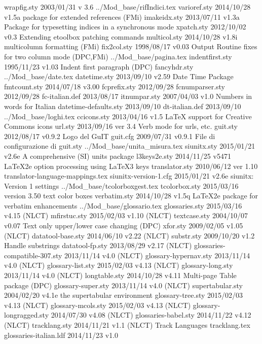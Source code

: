  wrapfig.sty    2003/01/31  v 3.6
../Mod_base/rifIndici.tex
varioref.sty    2014/10/28 v1.5a package for extended references (FMi)
imakeidx.sty    2013/07/11 v1.3a Package for typesetting indices in a synchronous mode
  xpatch.sty    2012/10/02 v0.3 Extending etoolbox patching commands
multicol.sty    2014/10/28 v1.8i multicolumn formatting (FMi)
 fix2col.sty    1998/08/17 v0.03 Output Routine fixes for two column mode (DPC,FMi)
../Mod_base/pagina.tex
indentfirst.sty    1995/11/23 v1.03 Indent first paragraph (DPC)
fancyhdr.sty    
../Mod_base/date.tex
datetime.sty    2013/09/10 v2.59 Date Time Package
fmtcount.sty    2014/07/18 v3.00
fcprefix.sty    2012/09/28
fcnumparser.sty    2012/09/28
fc-italian.def    2013/08/17
itnumpar.sty    2007/04/03 v1.0 Numbers in words for Italian
datetime-defaults.sty    2013/09/10
dt-italian.def    2013/09/10
../Mod_base/loghi.tex
 ccicons.sty    2013/04/16 v1.5 LaTeX support for Creative Commons icons
     url.sty    2013/09/16  ver 3.4  Verb mode for urls, etc.
    guit.sty    2012/08/17 v0.9.2 Logo del GuIT
    guit.cfg    2009/07/31 v0.9.1 File di configurazione di guit.sty
../Mod_base/unita_misura.tex
 siunitx.sty    2015/01/21 v2.6e A comprehensive (SI) units package
l3keys2e.sty    2014/11/25 v5471 LaTeX2e option processing using LaTeX3 keys
translator.sty    2010/06/12 ver 1.10
translator-language-mappings.tex
siunitx-version-1.cfg    2015/01/21 v2.6e siunitx: Version 1 settings
../Mod_base/tcolorboxgest.tex
tcolorbox.sty    2015/03/16 version 3.50 text color boxes
verbatim.sty    2014/10/28 v1.5q LaTeX2e package for verbatim enhancements
../Mod_base/glossario.tex
glossaries.sty    2015/03/16 v4.15 (NLCT)
mfirstuc.sty    2015/02/03 v1.10 (NLCT)
textcase.sty    2004/10/07 v0.07 Text only upper/lower case changing (DPC)
    xfor.sty    2009/02/05 v1.05 (NLCT)
datatool-base.sty    2014/06/10 v2.22 (NLCT)
  substr.sty    2009/10/20 v1.2 Handle substrings
datatool-fp.sty    2013/08/29 v2.17 (NLCT)
glossaries-compatible-307.sty    2013/11/14 v4.0 (NLCT)
glossary-hypernav.sty    2013/11/14 v4.0 (NLCT)
glossary-list.sty    2015/02/03 v4.13 (NLCT)
glossary-long.sty    2013/11/14 v4.0 (NLCT)
longtable.sty    2014/10/28 v4.11 Multi-page Table package (DPC)
glossary-super.sty    2013/11/14 v4.0 (NLCT)
supertabular.sty    2004/02/20 v4.1e the supertabular environment
glossary-tree.sty    2015/02/03 v4.13 (NLCT)
glossary-mcols.sty    2015/02/03 v4.13 (NLCT)
glossary-longragged.sty    2014/07/30 v4.08 (NLCT)
glossaries-babel.sty    2014/11/22 v4.12 (NLCT)
tracklang.sty    2014/11/21 v1.1 (NLCT) Track Languages
tracklang.tex
glossaries-italian.ldf    2014/11/23 v1.0
